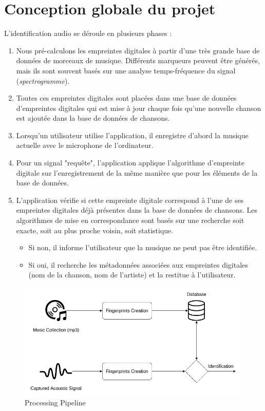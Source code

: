 \documentclass[10pt, english]{report}
\begin{document}
\section{Conception globale du projet}

L’identification audio se déroule en plusieurs phases :\\
\begin{enumerate}
	
	\item   Nous pré-calculons les empreintes digitales à partir d'une très grande base de données de morceaux de musique.
	 Différents marqueurs peuvent être générés, mais ils sont souvent basés sur une analyse temps-fréquence du signal (\textit{spectrogramme}).
	\item	Toutes ces empreintes digitales sont placées dans une base de données d'empreintes digitales qui est mise à jour chaque fois qu'une nouvelle chanson est ajoutée dans la base de données de chansons.
	\item   Lorsqu'un utilisateur utilise l'application, il enregistre d'abord la musique actuelle avec le microphone de l’ordinateur.
	\item	Pour un signal "requête", l’application applique l’algorithme d'empreinte digitale sur l'enregistrement de la même manière que pour les éléments de la base de données.
	\item   L'application vérifie si cette empreinte digitale correspond à l'une de ses empreintes digitales déjà présentes dans la base de données de chansons. Les algorithmes de mise en correspondance sont basés sur une recherche soit exacte, soit au plus proche voisin, soit statistique.\begin{itemize}
		\item Si non, il informe l'utilisateur que la musique ne peut pas être identifiée. 
		\item Si oui, il recherche les métadonnées associées aux empreintes digitales (nom de la chanson, nom de l’artiste) et la restitue à l'utilisateur.
	\end{itemize}
\end{enumerate}

\begin{figure}[H]
	\centering
	\includegraphics[scale=0.5]{img/general_schema2.png}
	\caption{Processing Pipeline}
\end{figure}
\end{document}
